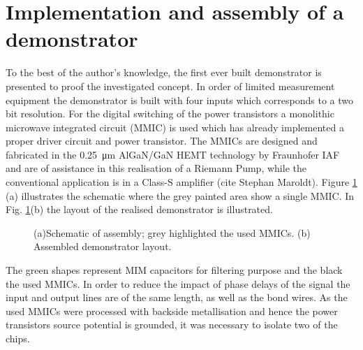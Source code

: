 \documentclass[journal]{IEEEtran}
\begin{document}
\section{Implementation and assembly of a demonstrator}
\label{sec:assembly}
To the best of the author's knowledge, the first ever built demonstrator is presented to proof the investigated concept.
In order of limited measurement equipment the demonstrator is built with four inputs which corresponds to a two bit resolution.
For the digital switching of the power transistors a monolithic microwave integrated circuit (MMIC) is used which has already implemented a proper driver circuit and power transistor.
The MMICs are designed and fabricated in the \SI{0.25}{\micro\meter} AlGaN/GaN HEMT technology by Fraunhofer IAF and are of assistance in this realisation of a Riemann Pump, while the conventional application is in a Class-S amplifier (cite Stephan Maroldt).
Figure \ref{fig:assembled_demonstrator} (a) illustrates the schematic where the grey painted area show a single MMIC.
In Fig. \ref{fig:assembled_demonstrator}(b) the layout of the realised demonstrator is illustrated.
%
\begin{figure}[htb]
  \centering
	\begin{scriptsize}
  	\def\svgwidth{\columnwidth}
 	 
  	\caption{(a)Schematic of assembly; grey highlighted the used MMICs. (b) Assembled demonstrator layout.}
  	\label{fig:assembled_demonstrator}
	\end{scriptsize}
\end{figure}
%
The green shapes represent MIM capacitors for filtering purpose and the black the used MMICs.
In order to reduce the impact of phase delays of the signal the input and output lines are of the same length, as well as the bond wires.
As the used MMICs were processed with backside metallisation and hence the power transistors source potential is grounded, it was necessary to isolate two of the chips.
\end{document}

